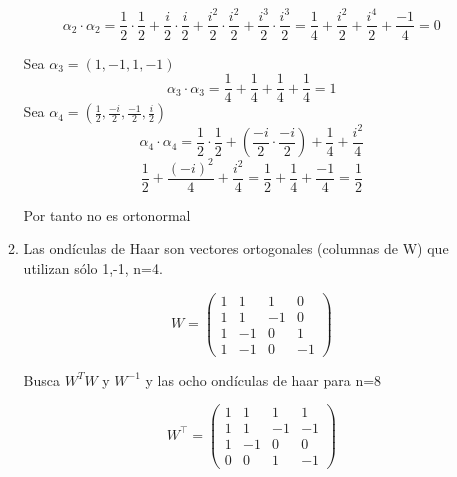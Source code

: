 \documentclass{report}
\begin{document}
\begin{enumerate}
\begin{enumerate}
    $$\alpha_2\cdot\alpha_2=\frac{1}{2}\cdot\frac{1}{2}+\frac{i}{2}\cdot\frac{i}{2}+\frac{i^2}{2}\cdot \frac{i^2}{2}+\frac{i^3}{2}\cdot\frac{i^3}{2}=\frac{1}{4}+\frac{i^2}{2}+\frac{i^4}{2}+\frac{-1}{4}=0$$
    
    Sea $\alpha_3=(1,-1,1,-1)$
    $$\alpha_3\cdot\alpha_3=\frac{1}{4}+\frac{1}{4}+\frac{1}{4}+\frac{1}{4}=1$$
    Sea $\alpha_4=(\frac{1}{2},\frac{-i}{2},\frac{-1}{2},\frac{i}{2})$
    $$\alpha_4\cdot\alpha_4=\frac{1}{2}\cdot\frac{1}{2}+\left(\frac{-i}{2}\cdot\frac{-i}{2}\right)+\frac{1}{4}+\frac{i^2}{4}$$
    $$\frac{1}{2}+\frac{(-i)^2}{4}+\frac{i^2}{4}=\frac{1}{2}+\frac{1}{4}+\frac{-1}{4}=\frac{1}{2}$$
    
    Por tanto no es ortonormal
    
    \item Las ondículas de Haar son vectores ortogonales (columnas de W) que utilizan sólo 1,-1, n=4.
    
    $$W=\begin{pmatrix}
        1 &1&1&0\\
        1 & 1 &-1 &0\\
        1 & -1 &0 &1\\
        1 & -1 &0 &-1
    \end{pmatrix}$$
    
    Busca $W^TW$ y $W^{-1}$ y las ocho ondículas de haar para n=8
    
    
    \[W^\top = \begin{pmatrix}
        1 & 1 & 1 & 1 \\
        1 & 1 & -1 & -1 \\
        1 & -1 & 0 & 0 \\
        0 & 0 & 1 & -1
    \end{pmatrix}\]
    

\end{enumerate}
\end{enumerate}
\end{document}
